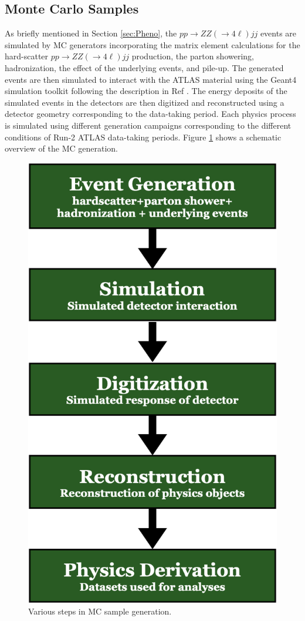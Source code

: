 

\subsection{Monte Carlo Samples }
\label{subsec:MCSamples}

As briefly mentioned in Section \ref{sec:Pheno}, the $pp \rightarrow ZZ (\rightarrow 4\ell) jj$ events are simulated by MC generators incorporating the matrix element calculations for the hard-scatter $pp \rightarrow ZZ (\rightarrow 4\ell) jj$ production, the parton showering, hadronization, the effect of the underlying events, and pile-up. The generated events are then simulated to interact with the ATLAS material using the Geant4 simulation toolkit following the description in Ref \cite{GEANT4}. The energy deposits of the simulated events in the detectors are then digitized and reconstructed using a detector geometry corresponding to the data-taking period. Each physics process is simulated using different generation campaigns corresponding to the different conditions of Run-2 ATLAS data-taking periods. Figure \ref{fig:MCGenerationSchematic} shows a schematic overview of the MC generation.
\begin{figure}
\centering
\includegraphics[width=.3\linewidth]{figures/AnalysisOverview/MCSchematic.png}  
  \caption{Various steps in MC sample generation.}
\label{fig:MCGenerationSchematic}
\end{figure}


